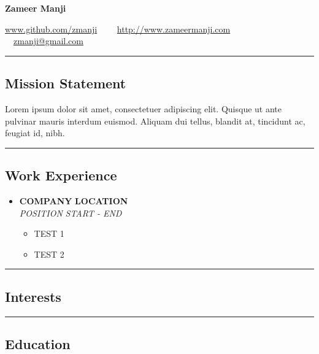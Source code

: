 \documentclass[10pt,letterpaper]{article}
\begin{document}
\begin{center}
{\huge \textbf{Zameer Manji}}


\href{http://www.github.com/zmanji/}{www.github.com/zmanji}\ \ \textbullet
\ \ \href{http://www.zameermanji.com}{http://www.zameermanji.com}\ \ \textbullet
\ \ \href{malto:zmanji@gmail.com}{zmanji@gmail.com}

\end{center}

\hrule
\vspace{-0.4em}
\subsection*{Mission Statement}

Lorem ipsum dolor sit amet, consectetuer adipiscing elit. Quisque ut ante
pulvinar mauris interdum euismod. Aliquam dui tellus, blandit at, tincidunt ac,
feugiat id, nibh.
\\

\hrule
\vspace{-0.4em}
\subsection*{Work Experience}
  \begin{itemize}
    \parskip=0.1em
    \item[]

    {\textbf{COMPANY} \hfill \textbf{LOCATION}}
    \\
    {\emph{POSITION} \hfill \emph{START - END}}

    \begin{itemize}
    \item[\textbullet] TEST 1
    \item[\textbullet] TEST 2
    \end{itemize}
  \end{itemize}


\hrule
\vspace{-0.4em}
\subsection*{Interests}

\hrule
\vspace{-0.4em}
\subsection*{Education}
\end{document}

